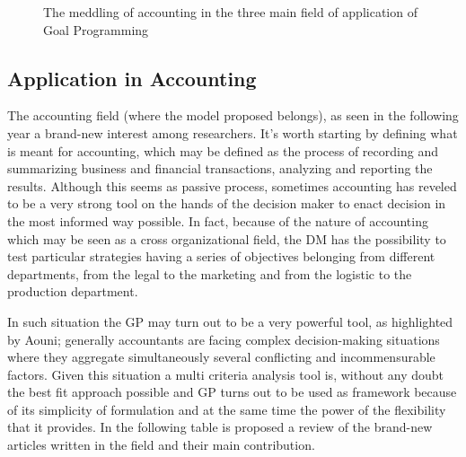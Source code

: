 \documentclass{article}
\def\firstcircle{(-2,6) circle (1.5cm)}
\def\secondcircle{(2,6) circle (1.5cm)}
\def\thirdcircle{(0,3.20) circle (1.5cm)}
\def\fourthcircle{(0,4.5) circle (1.5cm)}
\begin{document}
\begin{figure}
\begin{center}
\end{center}
\caption{The meddling of accounting in the three main field of application of Goal Programming} \label{fig:accounting}
\end{figure}

\subsection{Application in Accounting}
The accounting field (where the model proposed belongs), as seen in the following year a brand-new interest among researchers. It's worth starting by defining what is meant for accounting, which may be defined as the process of recording and summarizing business and financial transactions, analyzing and reporting the results. Although this seems as passive process, sometimes accounting has reveled to be a very strong tool on the hands of the decision maker\cite{Davidson1961} to enact decision in the most informed way possible. In fact, because of the nature of accounting which may be seen as a cross organizational field, the DM has the possibility to test particular strategies having a series of objectives belonging from different departments, from the legal to the marketing and from the logistic to the production department.

In such situation the GP may turn out to be a very powerful tool, as highlighted by Aouni\cite{aouni_goal_2017}; generally accountants are facing complex decision-making situations where they aggregate simultaneously several conflicting and incommensurable factors. Given this situation a multi criteria analysis tool is, without any doubt the best fit approach possible and GP turns out to be used as framework because of its simplicity of formulation and at the same time the power of the flexibility that it provides. In the following table is proposed a review of the brand-new articles written in the field and their main contribution.
\end{document}
